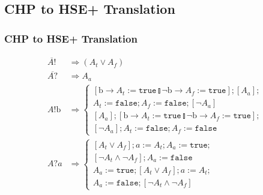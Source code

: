 \documentclass[compress]{beamer}
\begin{document}
\subsection{CHP to HSE+ Translation}
\begin{frame}
    \frametitle{CHP to HSE+ Translation}
    \small
    \begin{align*}
        \overline{A!} & \Rightarrow (A_t \vee A_f) \\
        \overline{A?} & \Rightarrow A_a \\
        A!\mathrm{b} & \Rightarrow \left\{ \begin{matrix} [\mathrm{b} \rightarrow A_t := \mathtt{true} \talloblong \neg \mathrm{b} \rightarrow A_f := \mathtt{true}]; [A_a];\\ A_t := \mathtt{false}; A_f := \mathtt{false}; [\neg A_a] \\
                                                          [A_a]; [\mathrm{b} \rightarrow A_t := \mathtt{true} \talloblong \neg \mathrm{b} \rightarrow A_f := \mathtt{true}];\\ [\neg A_a]; A_t := \mathtt{false}; A_f := \mathtt{false} \end{matrix} \right. \\
        A?a & \Rightarrow \left\{ \begin{matrix} [A_t \vee A_f]; a := A_t; A_a := \mathtt{true};\\ [\neg A_t \wedge \neg A_f]; A_a := \mathtt{false} \\
                                                 A_a := \mathtt{true}; [A_t \vee A_f]; a := A_t;\\ A_a := \mathtt{false}; [\neg A_t \wedge \neg A_f] \end{matrix} \right. \\
    \end{align*}
\end{frame}
\end{document}
